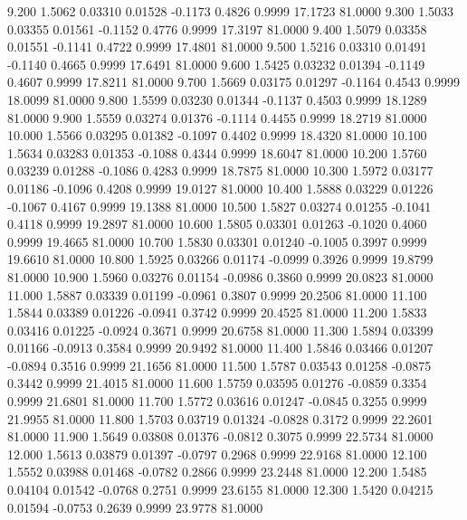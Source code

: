    9.200   1.5062   0.03310   0.01528  -0.1173   0.4826   0.9999  17.1723  81.0000
   9.300   1.5033   0.03355   0.01561  -0.1152   0.4776   0.9999  17.3197  81.0000
   9.400   1.5079   0.03358   0.01551  -0.1141   0.4722   0.9999  17.4801  81.0000
   9.500   1.5216   0.03310   0.01491  -0.1140   0.4665   0.9999  17.6491  81.0000
   9.600   1.5425   0.03232   0.01394  -0.1149   0.4607   0.9999  17.8211  81.0000
   9.700   1.5669   0.03175   0.01297  -0.1164   0.4543   0.9999  18.0099  81.0000
   9.800   1.5599   0.03230   0.01344  -0.1137   0.4503   0.9999  18.1289  81.0000
   9.900   1.5559   0.03274   0.01376  -0.1114   0.4455   0.9999  18.2719  81.0000
  10.000   1.5566   0.03295   0.01382  -0.1097   0.4402   0.9999  18.4320  81.0000
  10.100   1.5634   0.03283   0.01353  -0.1088   0.4344   0.9999  18.6047  81.0000
  10.200   1.5760   0.03239   0.01288  -0.1086   0.4283   0.9999  18.7875  81.0000
  10.300   1.5972   0.03177   0.01186  -0.1096   0.4208   0.9999  19.0127  81.0000
  10.400   1.5888   0.03229   0.01226  -0.1067   0.4167   0.9999  19.1388  81.0000
  10.500   1.5827   0.03274   0.01255  -0.1041   0.4118   0.9999  19.2897  81.0000
  10.600   1.5805   0.03301   0.01263  -0.1020   0.4060   0.9999  19.4665  81.0000
  10.700   1.5830   0.03301   0.01240  -0.1005   0.3997   0.9999  19.6610  81.0000
  10.800   1.5925   0.03266   0.01174  -0.0999   0.3926   0.9999  19.8799  81.0000
  10.900   1.5960   0.03276   0.01154  -0.0986   0.3860   0.9999  20.0823  81.0000
  11.000   1.5887   0.03339   0.01199  -0.0961   0.3807   0.9999  20.2506  81.0000
  11.100   1.5844   0.03389   0.01226  -0.0941   0.3742   0.9999  20.4525  81.0000
  11.200   1.5833   0.03416   0.01225  -0.0924   0.3671   0.9999  20.6758  81.0000
  11.300   1.5894   0.03399   0.01166  -0.0913   0.3584   0.9999  20.9492  81.0000
  11.400   1.5846   0.03466   0.01207  -0.0894   0.3516   0.9999  21.1656  81.0000
  11.500   1.5787   0.03543   0.01258  -0.0875   0.3442   0.9999  21.4015  81.0000
  11.600   1.5759   0.03595   0.01276  -0.0859   0.3354   0.9999  21.6801  81.0000
  11.700   1.5772   0.03616   0.01247  -0.0845   0.3255   0.9999  21.9955  81.0000
  11.800   1.5703   0.03719   0.01324  -0.0828   0.3172   0.9999  22.2601  81.0000
  11.900   1.5649   0.03808   0.01376  -0.0812   0.3075   0.9999  22.5734  81.0000
  12.000   1.5613   0.03879   0.01397  -0.0797   0.2968   0.9999  22.9168  81.0000
  12.100   1.5552   0.03988   0.01468  -0.0782   0.2866   0.9999  23.2448  81.0000
  12.200   1.5485   0.04104   0.01542  -0.0768   0.2751   0.9999  23.6155  81.0000
  12.300   1.5420   0.04215   0.01594  -0.0753   0.2639   0.9999  23.9778  81.0000
